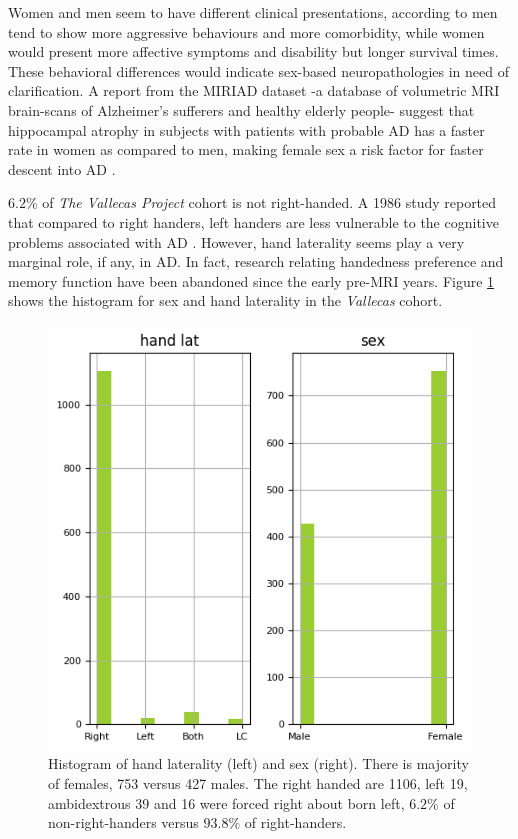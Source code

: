 \documentclass[11pt]{article}
\theoremstyle{definition}
\theoremstyle{remark}
\begin{document}
Women and men seem to have different clinical presentations, according to \cite{sinforiani2010impact} men tend to show more aggressive behaviours and more comorbidity, while women would present more affective symptoms and disability but longer survival times. These behavioral differences would indicate sex-based neuropathologies in need of clarification. A report from the MIRIAD dataset \cite{malone2013miriad} -a database of volumetric MRI brain-scans of Alzheimer's sufferers and healthy elderly people- suggest that hippocampal atrophy in subjects with patients with probable AD has a faster rate in women as compared to men, making female sex a risk factor for faster descent into AD \cite{ardekani2016analysis}.

$6.2\%$ of \emph{The Vallecas Project} cohort is not right-handed. A 1986 study reported that compared to right handers, left handers are less vulnerable to the cognitive problems associated with AD \cite{de1986reduced}. However, hand laterality seems play a very marginal role, if any, in AD. In fact, research relating handedness preference and memory function have been abandoned since the early pre-MRI years. Figure \ref{fig:sexlat} shows the histogram for sex and hand laterality in the \emph{Vallecas} cohort.
\begin{figure}[H]
        \centering
        \includegraphics[keepaspectratio, width=.4\linewidth]{figures/Fig_sexlat}
        \caption{Histogram of hand laterality (left) and sex (right). There is majority of females, 753 versus 427 males. The right handed are 1106, left 19, ambidextrous 39 and 16 were forced right about born left,  $6.2\%$ of non-right-handers versus $93.8\%$ of right-handers.} 
        \label{fig:sexlat}
\end{figure}
\end{document}
